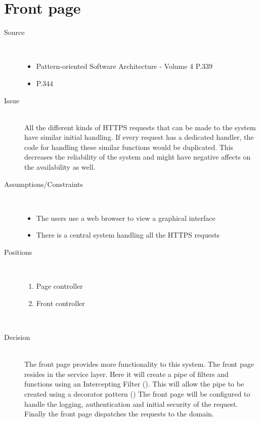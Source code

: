

\section{Front page}
\begin{description}
\item [Source]~\\
\begin{itemize}
\item Pattern-oriented Software Architecture - Volume 4 \cite{wiley-4} P.339
\item \EAA  \cite{Fowler:2002:PEA:579257} P.344

\end{itemize}

\item [Issue]~\\
All the different kinds of HTTPS requests that can be made to the system have similar initial handling. If every request has a dedicated handler, the code for handling these similar functions would be duplicated. This decreases the reliability  of the system and might have negative affects on the availability as well.

\item [Assumptions/Constraints]~\\
\begin{itemize}
\item The users use a web browser to view a graphical interface
\item There is a central system handling all the HTTPS requests
\end{itemize}

\item [Positions]~
\begin{enumerate}
\item Page controller
\item Front controller 
\end{enumerate}

~\\[-1.5cm]
\item [Decision] ~\\
The front page provides more functionality to this system. The front page resides in the service layer. Here it will create a pipe of filters and functions using an Intercepting Filter (\cite{eaa}). This will allow the pipe to be created using a decorator pattern (\cite{eaa}) The front page will be configured to handle the logging, authentication and initial security of the request. Finally the front page dispatches the requests to the domain. 


\end{description}
